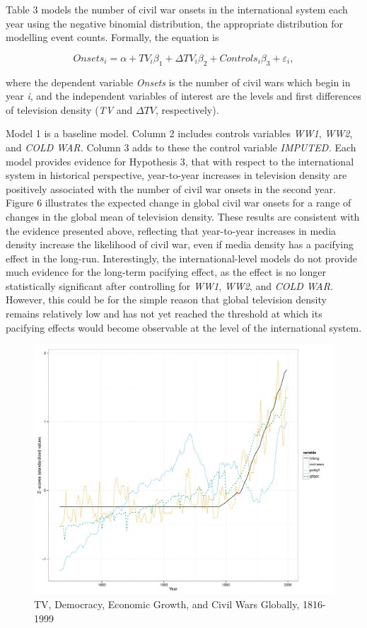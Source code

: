 \documentclass[11pt,article,oneside]{memoir}
\makeatletter
\def\maxwidth{\ifdim\Gin@nat@width>\linewidth\linewidth
\else\Gin@nat@width\fi}
\let\Oldincludegraphics\includegraphics
\renewcommand{\includegraphics}[1]{\Oldincludegraphics[width=\maxwidth]{#1}}
\makeatother
\begin{document}
Table 3 models the number of civil war onsets in the international
system each year using the negative binomial distribution, the
appropriate distribution for modelling event counts. Formally, the
equation is

\[ Onsets_{i} = \alpha + TV_{i} \beta_1 + \Delta TV_{i} \beta_2 + Controls_{i} \beta_3  + \varepsilon_{i}, \]

where the dependent variable \emph{Onsets} is the number of civil wars
which begin in year \emph{i}, and the independent variables of interest
are the levels and first differences of television density (\emph{TV}
and $\Delta TV$, respectively).

Model 1 is a baseline model. Column 2 includes controls variables
\emph{WW1}, \emph{WW2}, and \emph{COLD WAR.} Column 3 adds to these the
control variable \emph{IMPUTED.} Each model provides evidence for
Hypothesis 3, that with respect to the international system in
historical perspective, year-to-year increases in television density are
positively associated with the number of civil war onsets in the second
year. Figure 6 illustrates the expected change in global civil war
onsets for a range of changes in the global mean of television density.
These results are consistent with the evidence presented above,
reflecting that year-to-year increases in media density increase the
likelihood of civil war, even if media density has a pacifying effect in
the long-run. Interestingly, the international-level models do not
provide much evidence for the long-term pacifying effect, as the effect
is no longer statistically significant after controlling for \emph{WW1},
\emph{WW2}, and \emph{COLD WAR}. However, this could be for the simple
reason that global television density remains relatively low and has not
yet reached the threshold at which its pacifying effects would become
observable at the level of the international system.

\begin{figure}[htbp]
\centering
\includegraphics{./media_civil_war_files/figure-markdown/longrunplot.pdf}
\caption{TV, Democracy, Economic Growth, and Civil Wars Globally,
1816-1999}
\end{figure}
\end{document}
